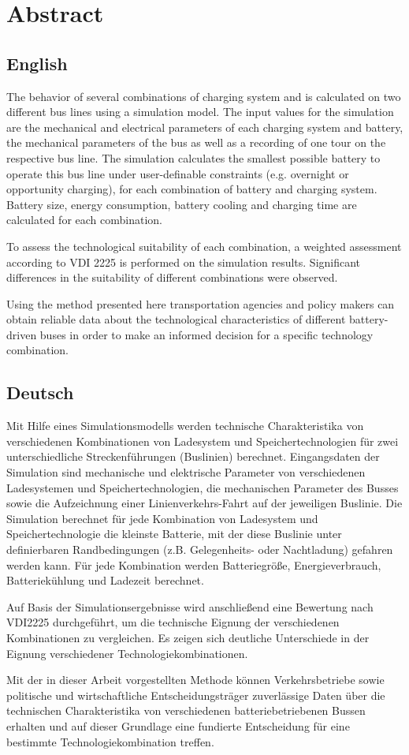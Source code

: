 \chapter*{Abstract}
\section*{English}
The behavior of several combinations of charging system and is calculated on two different bus lines using a simulation model. The input values for the simulation are the mechanical and electrical parameters of each charging system and battery, the mechanical parameters of the bus as well as a recording of one tour on the respective bus line. The simulation calculates the smallest possible battery to operate this bus line under user-definable constraints (e.g. overnight or opportunity charging), for each combination of battery and charging system. Battery size, energy consumption, battery cooling and charging time are calculated for each combination.

To assess the technological suitability of each combination, a weighted assessment according to VDI 2225 is performed on the simulation results. Significant differences in the suitability of different combinations were observed.

Using the method presented here transportation agencies and policy makers can obtain reliable data about the technological characteristics of different battery-driven buses in order to make an informed decision for a specific technology combination.

\section*{Deutsch}
Mit Hilfe eines Simulationsmodells werden technische Charakteristika von verschiedenen Kombinationen von Ladesystem und Speichertechnologien für zwei unterschiedliche Streckenführungen (Buslinien) berechnet. Eingangsdaten der Simulation sind mechanische und elektrische Parameter von verschiedenen Ladesystemen und Speichertechnologien, die mechanischen Parameter des Busses sowie die Aufzeichnung einer Linienverkehrs-Fahrt auf der jeweiligen Buslinie. Die Simulation berechnet für jede Kombination von Ladesystem und Speichertechnologie die kleinste Batterie, mit der diese Buslinie unter definierbaren Randbedingungen (z.B. Gelegenheits- oder Nachtladung) gefahren werden kann. Für jede Kombination werden Batteriegröße, Energieverbrauch, Batteriekühlung und Ladezeit berechnet.

Auf Basis der Simulationsergebnisse wird anschließend eine Bewertung nach VDI2225 durchgeführt, um die technische Eignung der verschiedenen Kombinationen zu vergleichen. Es zeigen sich deutliche Unterschiede in der Eignung verschiedener Technologiekombinationen.

Mit der in dieser Arbeit vorgestellten Methode können Verkehrsbetriebe sowie politische und wirtschaftliche Entscheidungsträger zuverlässige Daten über die technischen Charakteristika von verschiedenen batteriebetriebenen Bussen erhalten und auf dieser Grundlage eine fundierte Entscheidung für eine bestimmte Technologiekombination treffen.